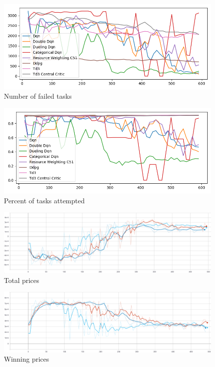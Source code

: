 \begin{figure}[H]
    \centering
    \includegraphics[width=\linewidth]{figures/5_evaluation_figs/algo_training_fig/num_failed_tasks.png}
    \caption{Number of failed tasks}
    \label{fig:algo_num_failed_tasks}
\end{figure}

\begin{figure}[H]
    \centering
    \includegraphics[width=\linewidth]{figures/5_evaluation_figs/algo_training_fig/percent_tasks.png}
    \caption{Percent of tasks attempted}
    \label{fig:algo_percent_tasks}
\end{figure}

\begin{figure}[H]
    \centering
    \includegraphics[width=\linewidth]{figures/5_evaluation_figs/algo_training_fig/total_prices.png}
    \caption{Total prices}
    \label{fig:algo_total_prices}
\end{figure}

\begin{figure}[H]
    \centering
    \includegraphics[width=\linewidth]{figures/5_evaluation_figs/algo_training_fig/total_winning_prices.PNG}
    \caption{Winning prices}
    \label{fig:algo_winning_prices}
\end{figure}

